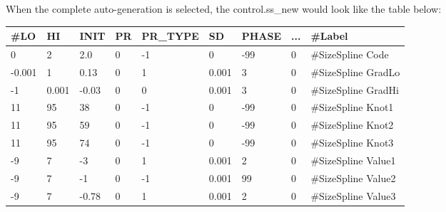 \begin{description}
	When the complete auto-generation is selected, the control.ss\_new would look like the table below:
	
	\begin{center}
		\begin{longtable}{p{1cm} p{1cm} p{1cm} p{1cm} p{1.75cm} p{1cm} p{1.2cm} p{1cm} p{3.8cm}}
			\#LO & HI & INIT & PR & PR\_TYPE & SD & PHASE &  ... & \#Label \\
			\hline
			0 &     2 &   2.0 & 0 & -1 & 0     & -99 & 0 & \#SizeSpline Code\\
			-0.001 & 	 1 &  0.13 & 0 &  1 & 0.001 & 	3 & 0 & \#SizeSpline GradLo\\
			-1 & 0.001 & -0.03 & 0 &  0 & 0.001 & 	3 & 0 & \#SizeSpline GradHi\\
			11 & 	95 & 	38 & 0 & -1 & 	  0 & -99 & 0 & \#SizeSpline Knot1\\
			11 & 	95 & 	59 & 0 & -1 &     0 & -99 & 0 & \#SizeSpline Knot2\\
			11 & 	95 & 	74 & 0 & -1 & 	  0 & -99 & 0 & \#SizeSpline Knot3\\
			-9 & 	 7 & 	-3 & 0 &  1 & 0.001 & 	2 & 0 & \#SizeSpline Value1\\
			-9 &   	 7 & 	-1 & 0 & -1 & 0.001 &  99 & 0 & \#SizeSpline Value2\\
			-9 & 	 7 & -0.78 & 0 &  1 & 0.001 & 	2 & 0 & \#SizeSpline Value3\\
			\hline
		\end{longtable}
	\end{center}
\end{description}

	

